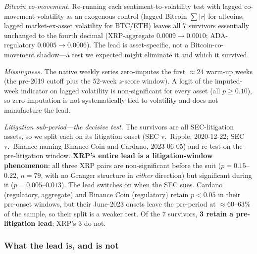\documentclass[pdflatex,sn-mathphys-num]{sn-jnl}
\theoremstyle{thmstyleone}
\theoremstyle{thmstyletwo}
\theoremstyle{thmstylethree}
\begin{document}
\emph{Bitcoin co-movement.} Re-running each sentiment-to-volatility test with lagged co-movement volatility as an exogenous control (lagged Bitcoin $\sum|r|$ for altcoins, lagged market-ex-asset volatility for BTC/ETH) leaves all 7 survivors essentially unchanged to the fourth decimal (XRP-aggregate $0.0009\to 0.0010$; ADA-regulatory $0.0005\to 0.0006$). The lead is asset-specific, not a Bitcoin-co-movement shadow---a test we expected might eliminate it and which it survived.

\emph{Missingness.} The native weekly series zero-imputes the first $\approx 24$ warm-up weeks (the pre-2019 cutoff plus the 52-week $z$-score window). A logit of the imputed-week indicator on lagged volatility is non-significant for every asset (all $p\geq 0.10$), so zero-imputation is not systematically tied to volatility and does not manufacture the lead.

\emph{Litigation sub-period---the decisive test.} The survivors are all SEC-litigation assets, so we split each on its litigation onset (SEC v.\ Ripple, 2020-12-22; SEC v.\ Binance naming Binance Coin and Cardano, 2023-06-05) and re-test on the pre-litigation window. \textbf{XRP's entire lead is a litigation-window phenomenon}: all three XRP pairs are non-significant before the suit ($p=0.15$--$0.22$, $n=79$, with no Granger structure in \emph{either} direction) but significant during it ($p=0.005$--$0.013$). The lead switches on when the SEC sues. Cardano (regulatory, aggregate) and Binance Coin (regulatory) retain $p<0.05$ in their pre-onset windows, but their June-2023 onsets leave the pre-period at $\approx 60$--$63\%$ of the sample, so their split is a weaker test. Of the 7 survivors, \textbf{3 retain a pre-litigation lead}; XRP's 3 do not.

\subsubsection{What the lead is, and is not}\label{sec:granger_verdict}
\end{document}
